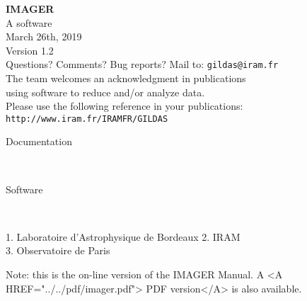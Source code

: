 \documentclass[11pt]{article}
\begin{document}

\begin{center}
  \huge{
  \textbf{IMAGER} 
  } \\[2\bigskipamount]
  \Large{}
  A \gildas{} software\\[\bigskipamount]
  March 26th, 2019\\[\bigskipamount]
  Version 1.2\\[2\bigskipamount]
  \large{}
  Questions? Comments? Bug reports? Mail to: \texttt{gildas@iram.fr}\\[2\bigskipamount]
  The \gildas{} team welcomes an acknowledgment in publications\\
  using \gildas{} software to reduce and/or analyze data.\\
  Please use the following reference in your publications:\\
  \texttt{http://www.iram.fr/IRAMFR/GILDAS}\\[2\bigskipamount]
\end{center}

\begin{description}
\item[Documentation] \mbox{}\\
\item[Software] \mbox{}\\
\end{description}
1. Laboratoire d'Astrophysique de Bordeaux
2. IRAM\\
3. Observatoire de Paris\\

\begin{rawhtml}
  Note: this is the on-line version of the IMAGER Manual.
  A <A HREF="../../pdf/imager.pdf"> PDF version</A>
  is also available.
\end{rawhtml}

\bigskip{} %
\end{document}
